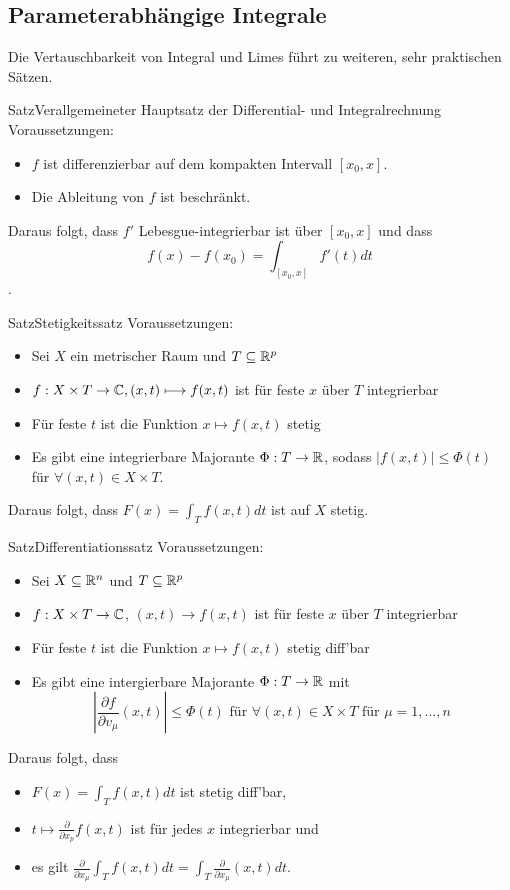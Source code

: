 \subsection{Parameterabhängige Integrale}
Die Vertauschbarkeit von Integral und Limes führt zu weiteren, sehr praktischen Sätzen.
\begin{Satz}{Satz}{Verallgemeineter Hauptsatz der Differential- und Integralrechnung}
Voraussetzungen:
\begin{itemize}
    \item $f$ ist differenzierbar auf dem kompakten Intervall $[x_0, x]$.
    \item Die Ableitung von $f$ ist beschränkt.
\end{itemize}
Daraus folgt, dass $f'$ Lebesgue-integrierbar ist über $[x_0, x]$ und dass $$f(x)-f(x_0)=\int_{[x_0, x]} f'(t)dt$$.
\end{Satz}
\begin{Satz}{Satz}{Stetigkeitssatz}
    Voraussetzungen:
    \begin{itemize}
        \item Sei $X$ ein metrischer Raum und $T\subseteq \mathbb{R}^p$
        \item $f:X\times T\rightarrow \mathbb{C}, (x,t)\longmapsto f(x,t)$ ist für feste $x$ über $T$ integrierbar
        \item Für feste $t$ ist die Funktion $x\longmapsto f(x,t)$ stetig
        \item Es gibt eine integrierbare Majorante $\Phi: T\rightarrow \mathbb{R}$, sodass $|f(x,t)|\leq \Phi(t)$ für $\forall (x,t)\in X\times T$.
    \end{itemize}
    Daraus folgt, dass $F(x)=\int_T f(x,t)dt$ ist auf $X$ stetig.
\end{Satz}
\begin{Satz}{Satz}{Differentiationssatz}
        Voraussetzungen:
    \begin{itemize}
        \item Sei $X\subseteq \mathbb{R}^n$ und $T\subseteq \mathbb{R}^p$
        \item $f: X\times T\rightarrow \mathbb{C}$, $(x,t)\rightarrow f(x,t)$ ist für feste $x$ über $T$ integrierbar
        \item Für feste $t$ ist die Funktion $x\longmapsto f(x,t)$ stetig diff'bar
        \item Es gibt eine intergierbare Majorante $\Phi:T\rightarrow \mathbb{R}$ mit
        $$|\frac{\partial f}{\partial v_\mu}(x,t)|\leq \Phi(t)\mbox{ für }\forall (x,t)\in X\times T\mbox{ für }\mu = 1,...,n$$
    \end{itemize}
    Daraus folgt, dass
    \begin{itemize}
        \item $F(x)=\int_T f(x,t)dt$ ist stetig diff'bar,
        \item $t\mapsto\frac{\partial}{\partial x_p}f(x,t)$ ist für jedes $x$ integrierbar und
        \item es gilt $\frac{\partial}{\partial x_\mu}\int_T f(x,t)dt=\int_T \frac{\partial}{\partial x_\mu} (x,t) dt$.
    \end{itemize}
\end{Satz}
